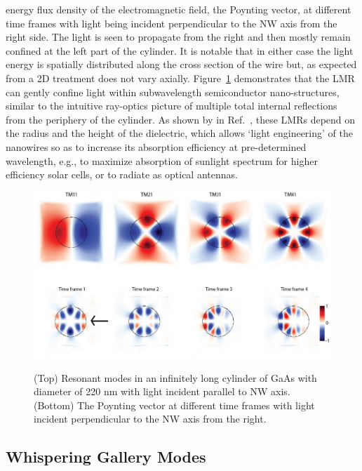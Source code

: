 energy flux density of the electromagnetic field, the Poynting vector, at
different time frames with light being incident perpendicular to the NW axis
from the right side. The light is seen to propagate from the right and then
mostly remain confined at the left part of the cylinder. It is notable that in
either case the light energy is spatially distributed along the cross section
of the wire but, as expected from a 2D treatment does not vary axially.
Figure~\ref{CylindEz} demonstrates that the LMR can gently confine light within
subwavelength semiconductor nano-structures, similar to the intuitive
ray-optics picture of multiple total internal reflections from the periphery of
the cylinder. As shown by in Ref.~\cite{Cao:2009ho}, these LMRs depend on the
radius and the height of the dielectric, which allows ‘light engineering’ of
the nanowires so as to increase its absorption efficiency at pre-determined
wavelength, e.g., to maximize absorption of sunlight spectrum for  higher
efficiency solar cells, or to radiate as optical antennas.

\begin{figure}
  \caption{(Top) Resonant modes in an infinitely long cylinder of GaAs with diameter of 220 nm with light incident parallel to NW axis. (Bottom) The Poynting vector at different time frames with light incident perpendicular to the NW axis from the right.}
  \centering
  \includegraphics[width=\textwidth]{pictures/LM/CylindEz}
  \label{CylindEz}
\end{figure}

\subsection{Whispering Gallery Modes}
\label{sec:host}


